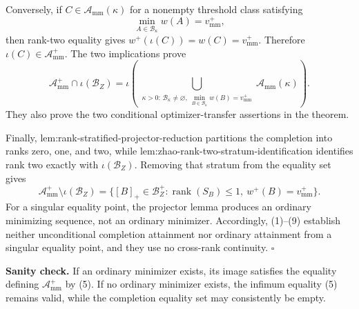 Conversely, if \(C\in\mathcal A_{\mathrm{mm}}(\kappa)\) for a nonempty threshold class satisfying
\[
\min_{A\in\mathcal B_\kappa}w(A)=v_{\mathrm{mm}}^+,
\]
then rank-two equality gives \(w^+(\iota(C))=w(C)=v_{\mathrm{mm}}^+\).  Therefore \(\iota(C)\in\mathcal A_{\mathrm{mm}}^+\).  The two implications prove
\[
\mathcal A_{\mathrm{mm}}^+\cap\iota(\mathcal B_Z)
=\iota\!\left(
\bigcup_{\substack{\kappa>0:\,
\mathcal B_\kappa\ne\varnothing,\ 
\min_{B\in\mathcal B_\kappa}w(B)=v_{\mathrm{mm}}^+}}
\mathcal A_{\mathrm{mm}}(\kappa)\right).                          \tag{8}
\]
They also prove the two conditional optimizer-transfer assertions in the theorem.

Finally, lem:rank-stratified-projector-reduction partitions the completion into ranks zero, one, and two, while lem:zhao-rank-two-stratum-identification identifies rank two exactly with \(\iota(\mathcal B_Z)\).  Removing that stratum from the equality set gives
\[
\mathcal A_{\mathrm{mm}}^+\setminus\iota(\mathcal B_Z)
=\{[B]_+\in\mathcal B_Z^+:\operatorname{rank}(S_B)\le1,
\ w^+(B)=v_{\mathrm{mm}}^+\}.                                    \tag{9}
\]
For a singular equality point, the projector lemma produces an ordinary minimizing sequence, not an ordinary minimizer.  Accordingly, (1)--(9) establish neither unconditional completion attainment nor ordinary attainment from a singular equality point, and they use no cross-rank continuity. \(\square\)

\textbf{Sanity check.}
If an ordinary minimizer exists, its image satisfies the equality defining \(\mathcal A_{\mathrm{mm}}^+\) by (5).  If no ordinary minimizer exists, the infimum equality (5) remains valid, while the completion equality set may consistently be empty.